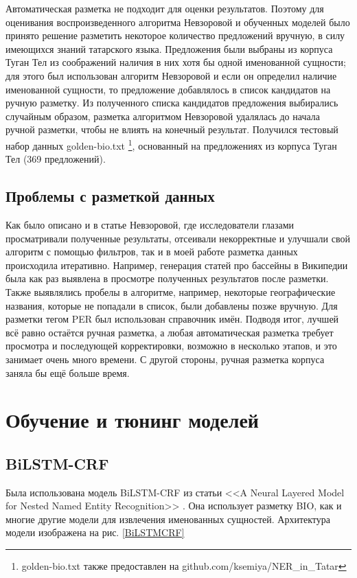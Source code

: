 Автоматическая разметка не подходит для оценки результатов. Поэтому для оценивания воспроизведенного алгоритма Невзоровой и обученных моделей было принято решение разметить некоторое количество предложений вручную, в силу имеющихся знаний татарского языка. Предложения были выбраны из корпуса Туган Тел из соображений наличия в них хотя бы одной именованной сущности; для этого был использован алгоритм Невзоровой и если он определил наличие именованной сущности, то предложение добавлялось в список кандидатов на ручную разметку. Из полученного списка кандидатов предложения выбирались случайным образом, разметка алгоритмом Невзоровой удалялась до начала ручной разметки, чтобы не влиять на конечный результат. Получился тестовый набор данных golden-bio.txt \footnote{golden-bio.txt также предоставлен на github.com/ksemiya/NER\_in\_Tatar}, основанный на предложениях из корпуса Туган Тел (369 предложений).

\subsection{Проблемы с разметкой данных}

Как было описано и в статье Невзоровой, где исследователи глазами просматривали полученные результаты, отсеивали некорректные и улучшали свой алгоритм с помощью фильтров, так и в моей работе разметка данных происходила итеративно. Например, генерация статей про бассейны в Википедии была как раз выявлена в просмотре полученных результатов после разметки. Также выявлялись пробелы в алгоритме, например, некоторые географические названия, которые не попадали в список, были добавлены позже вручную. Для разметки тегом PER был использован справочник имён. Подводя итог, лучшей всё равно остаётся ручная разметка, а любая автоматическая разметка требует просмотра и последующей корректировки, возможно в несколько этапов, и это занимает очень много времени. С другой стороны, ручная разметка корпуса заняла бы ещё больше время.

\section{Обучение и тюнинг моделей}

\subsection{BiLSTM-CRF}

Была использована модель BiLSTM-CRF из статьи <<A Neural Layered Model for Nested Named Entity Recognition>> \cite{ju-etal-2018-neural}. Она использует разметку BIO, как и многие другие модели для извлечения именованных сущностей. Архитектура модели изображена на рис. \ref{BiLSTMCRF}

